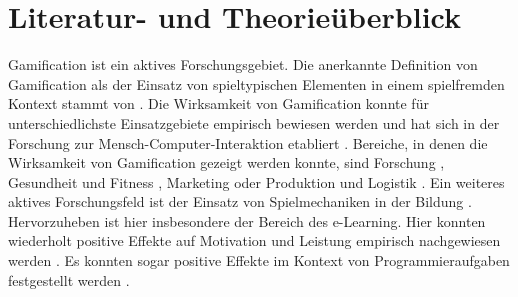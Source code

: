\documentclass[
    a4paper,
    doc,
    12pt,
    natbib,
]{apa6}
\begin{document}
\section{Literatur- und Theorieüberblick}
Gamification ist ein aktives Forschungsgebiet. 
Die anerkannte Definition von Gamification als der Einsatz von spieltypischen Elementen in einem spielfremden Kontext stammt von \cite{deterding_game_2011}. 
Die Wirksamkeit von Gamification konnte für unterschiedlichste Einsatzgebiete empirisch bewiesen werden \citep{koivisto_rise_2019} und hat sich in der Forschung zur Mensch-Computer-Interaktion etabliert \citep{huotari_defining_2012}. 
Bereiche, in denen die Wirksamkeit von Gamification gezeigt werden konnte, sind Forschung \citep{brauer_erhohung_2019}, Gesundheit und Fitness \citep{johnson_gamification_2016}, Marketing \citep{huotari_defining_2012} oder Produktion und Logistik \citep{warmelink_gamification_2018}.
Ein weiteres aktives Forschungsfeld ist der Einsatz von Spielmechaniken in der Bildung \citep{ibanez_gamification_2014}. Hervorzuheben ist hier insbesondere der Bereich des e-Learning. Hier konnten wiederholt positive Effekte auf Motivation und Leistung empirisch nachgewiesen werden \citep{ibanez_gamification_2014,hamzah_influence_2015,strmecki_gamification_2015}. Es konnten sogar positive Effekte im Kontext von Programmieraufgaben festgestellt werden \citep{ortiz_gamification_2017,layth_khaleel_empirical_2019}.  






\end{document}
